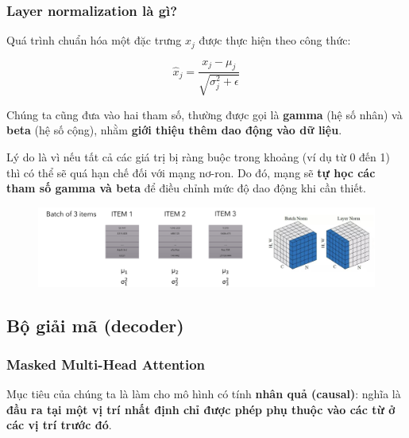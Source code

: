 \documentclass{book}
\begin{document}
            \subsubsection{Layer normalization là gì?}
            Quá trình chuẩn hóa một đặc trưng \( x_j \) được thực hiện theo công thức:
            
            \[
            \hat{x}_j = \frac{x_j - \mu_j}{\sqrt{\sigma_j^2 + \epsilon}}
            \]
            
            \medskip
            
            Chúng ta cũng đưa vào hai tham số, thường được gọi là \textbf{gamma} (hệ số nhân) và \textbf{beta} (hệ số cộng), nhằm \textbf{giới thiệu thêm dao động vào dữ liệu}. 
            
            \smallskip
            
            Lý do là vì nếu tất cả các giá trị bị ràng buộc trong khoảng (ví dụ từ 0 đến 1) thì có thể sẽ quá hạn chế đối với mạng nơ-ron. Do đó, mạng sẽ \textbf{tự học các tham số gamma và beta} để điều chỉnh mức độ dao động khi cần thiết.
            \begin{figure}[H]
                    \centering
                    \includegraphics[width=1.0  \linewidth]{images/12d_15.png}
            
            \end{figure}
        \subsection{Bộ giải mã (decoder)}
        \subsubsection{Masked Multi-Head Attention}
        Mục tiêu của chúng ta là làm cho mô hình có tính \textbf{nhân quả (causal)}:  
        nghĩa là \textbf{đầu ra tại một vị trí nhất định chỉ được phép phụ thuộc vào các từ ở các vị trí trước đó}.  
        
        \medskip
        
\end{document}
